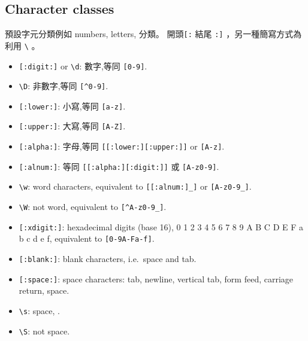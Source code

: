 \documentclass[]{book}
\providecommand{\tightlist}{%
  \setlength{\itemsep}{0pt}\setlength{\parskip}{0pt}}
\theoremstyle{definition}
\theoremstyle{definition}
\theoremstyle{definition}
\theoremstyle{remark}
\begin{document}
\hypertarget{character-classes}{%
\subsection{Character classes}\label{character-classes}}

預設字元分類例如 numbers, letters, 分類。 開頭\texttt{{[}:} 結尾
\texttt{:{]}} ，另一種簡寫方式為利用 \texttt{\textbackslash{}} 。

\begin{itemize}
\tightlist
\item
  \texttt{{[}:digit:{]}} or \texttt{\textbackslash{}d}: 數字,等同
  \texttt{{[}0-9{]}}.\\
\item
  \texttt{\textbackslash{}D}: 非數字,等同 \texttt{{[}\^{}0-9{]}}.\\
\item
  \texttt{{[}:lower:{]}}: 小寫,等同 \texttt{{[}a-z{]}}.\\
\item
  \texttt{{[}:upper:{]}}: 大寫,等同 \texttt{{[}A-Z{]}}.\\
\item
  \texttt{{[}:alpha:{]}}: 字母,等同
  \texttt{{[}{[}:lower:{]}{[}:upper:{]}{]}} or \texttt{{[}A-z{]}}.\\
\item
  \texttt{{[}:alnum:{]}}: 等同 \texttt{{[}{[}:alpha:{]}{[}:digit:{]}{]}}
  或 \texttt{{[}A-z0-9{]}}.\\
\item
  \texttt{\textbackslash{}w}: word characters, equivalent to
  \texttt{{[}{[}:alnum:{]}\_{]}} or \texttt{{[}A-z0-9\_{]}}.\\
\item
  \texttt{\textbackslash{}W}: not word, equivalent to
  \texttt{{[}\^{}A-z0-9\_{]}}.\\
\item
  \texttt{{[}:xdigit:{]}}: hexadecimal digits (base 16), 0 1 2 3 4 5 6 7
  8 9 A B C D E F a b c d e f, equivalent to \texttt{{[}0-9A-Fa-f{]}}.
\item
  \texttt{{[}:blank:{]}}: blank characters, i.e.~space and tab.\\
\item
  \texttt{{[}:space:{]}}: space characters: tab, newline, vertical tab,
  form feed, carriage return, space.
\item
  \texttt{\textbackslash{}s}: space, \texttt{}.\\
\item
  \texttt{\textbackslash{}S}: not space.\\

\end{itemize}
\end{document}
